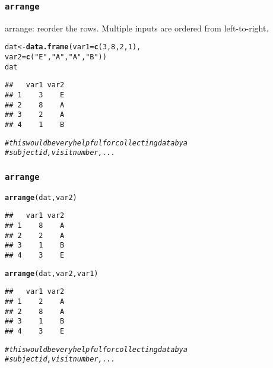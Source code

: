 \documentclass{beamer}\usepackage[]{graphicx}\usepackage[]{color}
\makeatletter
\newcommand{\hlnum}[1]{\textcolor[rgb]{0.686,0.059,0.569}{#1}}%
\newcommand{\hlstr}[1]{\textcolor[rgb]{0.192,0.494,0.8}{#1}}%
\newcommand{\hlcom}[1]{\textcolor[rgb]{0.678,0.584,0.686}{\textit{#1}}}%
\newcommand{\hlstd}[1]{\textcolor[rgb]{0.345,0.345,0.345}{#1}}%
\newcommand{\hlkwb}[1]{\textcolor[rgb]{0.69,0.353,0.396}{#1}}%
\newcommand{\hlkwc}[1]{\textcolor[rgb]{0.333,0.667,0.333}{#1}}%
\newcommand{\hlkwd}[1]{\textcolor[rgb]{0.737,0.353,0.396}{\textbf{#1}}}%
\newenvironment{kframe}{%
 \def\at@end@of@kframe{}%
 \ifinner\ifhmode%
  \def\at@end@of@kframe{\end{minipage}}%
  \begin{minipage}{\columnwidth}%
 \fi\fi%
 \def\FrameCommand##1{\hskip\@totalleftmargin \hskip-\fboxsep
 \colorbox{shadecolor}{##1}\hskip-\fboxsep
     \hskip-\linewidth \hskip-\@totalleftmargin \hskip\columnwidth}%
 \MakeFramed {\advance\hsize-\width
   \@totalleftmargin\z@ \linewidth\hsize
   \@setminipage}}%
 {\par\unskip\endMakeFramed%
 \at@end@of@kframe}
\newenvironment{knitrout}{}{} %
\makeatother
\begin{document}
\begin{frame}[fragile]
  \frametitle{{\tt arrange}}
arrange: reorder the rows. Multiple inputs are ordered from left-to-right.
\begin{knitrout}\footnotesize
{}\color{fgcolor}\begin{kframe}
\begin{alltt}
\hlstd{dat} \hlkwb{<-} \hlkwd{data.frame}\hlstd{(}\hlkwc{var1} \hlstd{=} \hlkwd{c}\hlstd{(}\hlnum{3}\hlstd{,} \hlnum{8}\hlstd{,} \hlnum{2}\hlstd{,} \hlnum{1}\hlstd{),}
                  \hlkwc{var2} \hlstd{=} \hlkwd{c}\hlstd{(}\hlstr{"E"}\hlstd{,} \hlstr{"A"}\hlstd{,} \hlstr{"A"}\hlstd{,} \hlstr{"B"}\hlstd{))}
\hlstd{dat}
\end{alltt}
\begin{verbatim}
##   var1 var2
## 1    3    E
## 2    8    A
## 3    2    A
## 4    1    B
\end{verbatim}
\begin{alltt}
\hlcom{# this would be very helpful for collecting data by a}
\hlcom{# subject id, visit number, ...}
\end{alltt}
\end{kframe}
\end{knitrout}
\end{frame} 

\begin{frame}[fragile]
  \frametitle{{\tt arrange}}
\begin{knitrout}\footnotesize
{}\color{fgcolor}\begin{kframe}
\begin{alltt}
\hlkwd{arrange}\hlstd{(dat, var2)}
\end{alltt}
\begin{verbatim}
##   var1 var2
## 1    8    A
## 2    2    A
## 3    1    B
## 4    3    E
\end{verbatim}
\begin{alltt}
\hlkwd{arrange}\hlstd{(dat, var2, var1)}
\end{alltt}
\begin{verbatim}
##   var1 var2
## 1    2    A
## 2    8    A
## 3    1    B
## 4    3    E
\end{verbatim}
\begin{alltt}
\hlcom{# this would be very helpful for collecting data by a}
\hlcom{# subject id, visit number, ...}
\end{alltt}
\end{kframe}
\end{knitrout}
\end{frame} 
\end{document}
